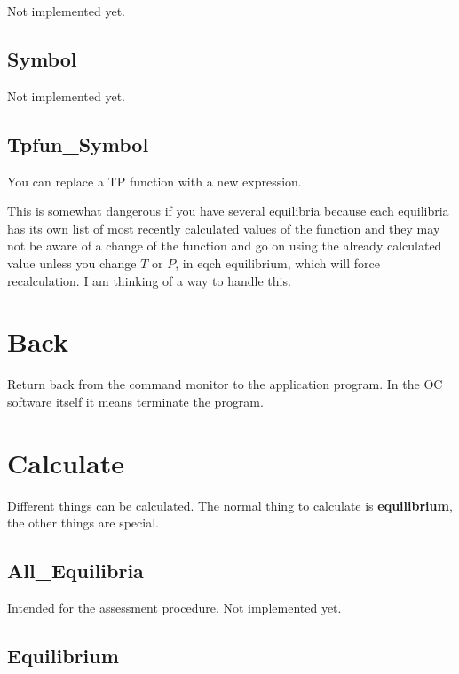 \documentclass[12pt]{article}
\begin{document}
Not implemented yet.

\subsection{Symbol}

Not implemented yet.

\subsection{Tpfun\_Symbol}

You can replace a TP function with a new expression.

This is somewhat dangerous if you have several equilibria because each
equilibria has its own list of most recently calculated values of the
function and they may not be aware of a change of the function and go
on using the already calculated value unless you change $T$ or $P$, in
eqch equilibrium, which will force recalculation.  I am thinking of a
way to handle this.

\section{Back }

Return back from the command monitor to the application program.  In
the OC software itself it means terminate the program.

\section{Calculate }

Different things can be calculated.  The normal thing to calculate is
{\bf equilibrium}, the other things are special.

\subsection{All\_Equilibria}

Intended for the assessment procedure.  Not implemented yet.

\subsection{Equilibrium}
\end{document}
